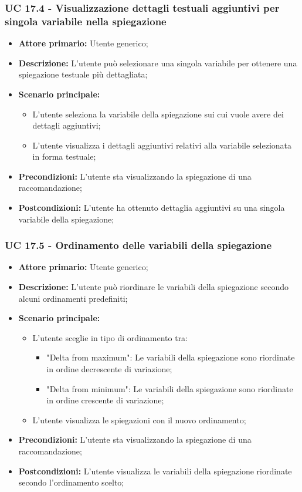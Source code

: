 \subsubsection{UC 17.4 - Visualizzazione dettagli testuali aggiuntivi per singola variabile nella spiegazione}
\begin{itemize}
	\item \textbf{Attore primario:} Utente generico;
	\item \textbf{Descrizione:} L'utente può selezionare una singola variabile per ottenere una spiegazione testuale più dettagliata;
	\item \textbf{Scenario principale:} 
		\begin{itemize}
			\item L'utente seleziona la variabile della spiegazione sui cui vuole avere dei dettagli aggiuntivi;
			\item L'utente visualizza i dettagli aggiuntivi relativi alla variabile selezionata in forma testuale;
		\end{itemize}
	
	\item \textbf{Precondizioni:} L'utente sta visualizzando la spiegazione di una raccomandazione;
	\item \textbf{Postcondizioni:} L'utente ha ottenuto dettaglia aggiuntivi su una singola variabile della spiegazione;
\end{itemize}

\subsubsection{UC 17.5 - Ordinamento delle variabili della spiegazione}
\begin{itemize}
	\item \textbf{Attore primario:} Utente generico;
	\item \textbf{Descrizione:} L'utente può riordinare le variabili della spiegazione secondo alcuni ordinamenti predefiniti;
	\item \textbf{Scenario principale:} 
	\begin{itemize}
		\item L'utente sceglie in tipo di ordinamento tra:
			\begin{itemize}
				\item "Delta from maximum": Le variabili della spiegazione sono riordinate in ordine decrescente di variazione;
				\item "Delta from minimum": Le variabili della spiegazione sono riordinate in ordine crescente di variazione;
			\end{itemize}
		\item L'utente visualizza le spiegazioni con il nuovo ordinamento;
	\end{itemize}
	\item \textbf{Precondizioni:} L'utente sta visualizzando la spiegazione di una raccomandazione;
	\item \textbf{Postcondizioni:} L'utente visualizza le variabili della spiegazione riordinate secondo l'ordinamento scelto;
\end{itemize}


